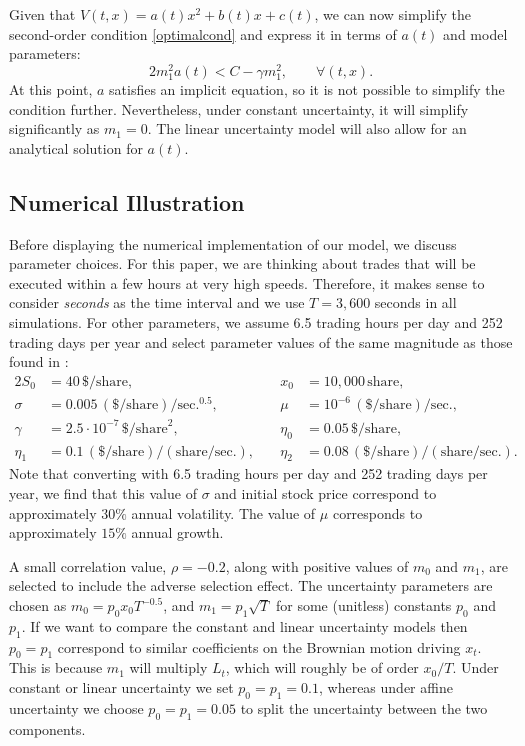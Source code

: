 \documentclass[12pt, letterpaper]{article}
\numberwithin{equation}{section}
\numberwithin{theorem}{section}
\begin{document}
Given that $V(t,x)=a(t)x^2+b(t)x+c(t)$, we can now simplify the second-order condition \eqref{optimalcond} and express it in terms of $a(t)$ and  model parameters:
\begin{equation}
	2m_1^2 a(t)< {{C}-\gamma m_1^2}, \qquad \forall (t,x).
\end{equation}
At    this point, $a$ satisfies an implicit equation, so  it is not possible to simplify the condition further. Nevertheless, under constant uncertainty, it will simplify significantly  as $m_1=0$. The linear uncertainty model will also allow for an analytical solution for $a(t)$. 
	



\subsection{Numerical Illustration}\label{sec:numerics_first}
Before displaying the numerical implementation of our model, we discuss parameter choices. For this paper, we are thinking about trades that will be executed within a few hours at very high speeds. Therefore, it makes sense  to consider \emph{seconds} as the time interval and we use $T=3,600$ seconds in all simulations. For other parameters, we assume 6.5 trading hours per day and 252 trading days per year and select parameter values of the same magnitude as those found in \cite{AC2000}:
\begin{alignat}{2}
 S_0&= 40\,\$/\text{share},&\quad x_0 &= 10,000\,\text{share},\\
\sigma&= 0.005\,(\$/\text{share})/\text{sec.}^{0.5}, &\quad \mu &= 10^{-6}\,(\$/\text{share})/\text{sec.},\\
\gamma&= 2.5\cdot10^{-7}\,\$/\text{share}^2,&\quad \eta_0 &= 0.05\,\$/\text{share},\\
\eta_1 &= 0.1\,(\$/\text{share})/(\text{share}/\text{sec.}),&\quad
\eta_2 &= 0.08\,(\$/\text{share})/(\text{share}/\text{sec.}).
\end{alignat}
Note that converting with 6.5 trading hours per day and 252 trading days per year, we find that this value of $\sigma$ and initial stock price correspond to approximately $30\%$ annual volatility. The value of $\mu$ corresponds to approximately $15\%$ annual growth.

A small correlation value, $\rho=-0.2$, along with positive values of $m_0$ and $m_1$, are selected to include the  adverse selection effect. The uncertainty parameters are chosen as $m_0=p_0 {x_0}{{T}^{-0.5}}$, and $m_1=p_1\sqrt{T}$ for some (unitless) constants $p_0$ and $p_1$. If we want to compare the constant and linear uncertainty models then $p_0=p_1$ correspond to similar coefficients on the Brownian motion driving $x_t$. This is because $m_1$ will multiply $L_t$, which will roughly be of order $ {x_0}/{T}$.  Under  constant or linear uncertainty we set $p_0=p_1=0.1$,  whereas under affine uncertainty  we choose $p_0=p_1=0.05$ to  split the uncertainty between the two components. 
\end{document}
